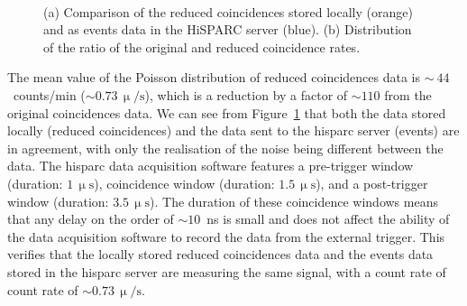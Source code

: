 \begin{figure}[ht!]
	\centering
	 \\
	
	\caption{(a) Comparison of the reduced coincidences stored locally (orange) and as events data in the HiSPARC server (blue). (b) Distribution of the ratio of the original and reduced coincidence rates.}
	\label{fig:reduced_coincidences}
\end{figure}

The mean value of the Poisson distribution of reduced coincidences data is $\sim~44$~counts/min ($\sim 0.73 \, \upmu/\mathrm{s}$), which is a reduction by a factor of $\sim 110$ from the original coincidences data. We can see from Figure~\ref{fig:reduced_coincidences} that both the data stored locally (reduced coincidences) and the data sent to the \gls{hisparc} server (events) are in agreement, with only the realisation of the noise being different between the data. The \gls{hisparc} data acquisition software features a pre-trigger window (duration: $1 \, \upmu\mathrm{s}$), coincidence window (duration: $1.5 \, \upmu\mathrm{s}$), and a post-trigger window (duration: $3.5 \, \upmu\mathrm{s}$). The duration of these coincidence windows means that any delay on the order of $\sim 10$~ns is small and does not affect the ability of the data acquisition software to record the data from the external trigger. This verifies that the locally stored reduced coincidences data and the events data stored in the \gls{hisparc} server are measuring the same signal, with a count rate of count rate of $\sim 0.73 \, \upmu/\mathrm{s}$.


